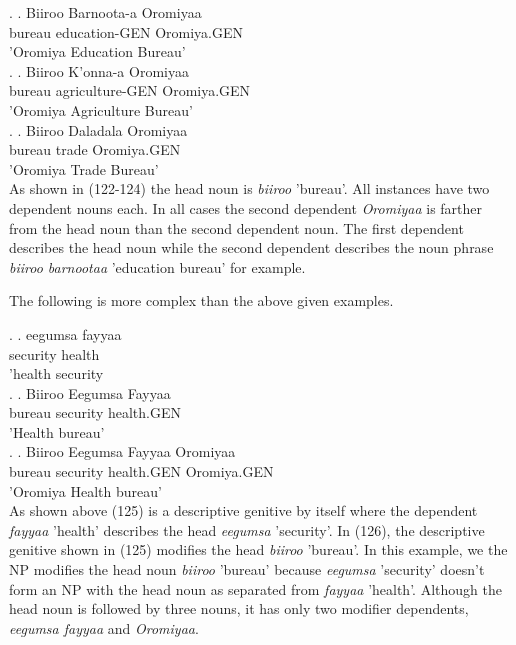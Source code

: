 \documentclass[11pt,a4paper]{article}
\begin{document}
	\ex.
	\ag.
	Biiroo Barnoota-a Oromiyaa\\
	bureau education-GEN Oromiya.GEN\\
	'Oromiya Education Bureau'\\
	
	\ex.
	\ag.
	Biiroo K'onna-a Oromiyaa\\
	bureau agriculture-GEN Oromiya.GEN\\
	'Oromiya Agriculture Bureau'\\
	
	\ex.
	\ag.
	Biiroo Daladala Oromiyaa\\
	bureau trade Oromiya.GEN\\
	'Oromiya Trade Bureau'\\
	
	As shown in (122-124) the head noun is \emph{biiroo} 'bureau'. All instances have two dependent nouns each. In all cases the second dependent \emph{Oromiyaa} is farther from the head noun than the second dependent noun. The first dependent describes the head noun while the second dependent describes the noun phrase \emph{biiroo barnootaa} 'education bureau' for example.
	
	The following is more complex than the above given examples.
	
	\ex.
	\ag.
	eegumsa fayyaa\\
	security health\\
	'health security\\
	
	\ex.
	\ag.
	Biiroo Eegumsa Fayyaa\\
	bureau security health.GEN\\
	'Health bureau'\\
	
	\ex.
	\ag.
	Biiroo Eegumsa Fayyaa Oromiyaa\\
	bureau security health.GEN Oromiya.GEN\\
	'Oromiya Health bureau'\\
	
	As shown above (125) is a descriptive genitive by itself where the dependent \emph{fayyaa} 'health' describes the head \emph{eegumsa} 'security'. In (126), the descriptive genitive shown in (125) modifies the head \emph{biiroo} 'bureau'. In this example, we the NP modifies the head noun \emph{biiroo} 'bureau' because \emph{eegumsa} 'security' doesn't form an NP with the head noun as separated from \emph{fayyaa} 'health'. Although the head noun is followed by three nouns, it has only two modifier dependents, \emph{eegumsa fayyaa} and \emph{Oromiyaa}. 
	
\end{document}

